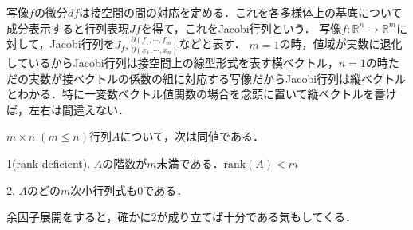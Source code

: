 \documentclass[uplatex, dvipdfmx]{jsreport}
\begin{document}
\begin{definition}[Jacobi行列]
    写像$f$の微分$df$は接空間の間の対応を定める．これを各多様体上の基底について成分表示すると行列表現$Jf$を得て，これをJacobi行列という．
    写像$f:\mathbb{R}^n\to\mathbb{R}^m$に対して，Jacobi行列を$J_f, \frac{\partial (f_1,\cdots,f_m)}{\partial (x_1,\cdots,x_n)}$などと表す．
    $m=1$の時，値域が実数に退化しているからJacobi行列は接空間上の線型形式を表す横ベクトル，$n=1$の時ただの実数が接ベクトルの係数の組に対応する写像だからJacobi行列は縦ベクトルとわかる．特に一変数ベクトル値関数の場合を念頭に置いて縦ベクトルを書けば，左右は間違えない．
\end{definition}

\begin{lemma}[行列の階数落ちの特徴付け]
    $m\times n\; (m\le n)$行列$A$について，次は同値である．

    1(rank-deficient). $A$の階数が$m$未満である．$\mathrm{rank}(A)<m$

    2. $A$のどの$m$次小行列式も$0$である．
\end{lemma}
\begin{remark}
    余因子展開をすると，確かに2が成り立てば十分である気もしてくる．
\end{remark}
\end{document}

